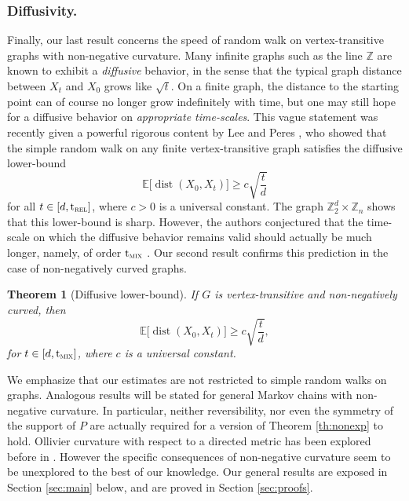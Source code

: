 \documentclass[JEP,XML,SOM,Unicode,NoEqCountersInSection,published]{cedram}
\newtheorem{theorem}{Theorem}
\theoremstyle{definition}
\newcommand{\dZ}{\mathbb {Z}}
\newcommand{\EE}{{\mathbb{E}}}
\newcommand{\trel}{\mathrm{t}_{\textup{\textsc{rel}}}}
\newcommand{\tmix}{\mathrm{t}_{\textup{\textsc{mix}}}}
\DeclareMathOperator{\dist}{dist}
\begin{document}
\subsubsection*{Diffusivity.}Finally, our last result concerns the speed of random walk on vertex-transitive graphs with non-negative curvature. Many infinite graphs such as the line $\dZ$ are known to exhibit a \emph{diffusive} behavior, in the sense that the typical graph distance between $X_t$ and $X_0$ grows like $\sqrt{t}$. On a finite graph, the distance to the starting point can of course no longer grow indefinitely with time, but one may still hope for a diffusive behavior on \emph{appropriate time-scales}. This vague statement was recently given a powerful rigorous content by Lee and Peres \cite{MR3127886}, who showed that the simple random walk on any finite vertex-transitive graph satisfies the diffusive lower-bound
\begin{equation*}
\EE \bigl[\dist(X_0,X_t) \bigr] \ge c\sqrt{\frac{t}{d}}
\end{equation*} for all $t\in[d,\trel]$, where $c>0$ is a universal constant. The graph $\dZ_2^{d}\times \dZ_n$ shows that this lower-bound is sharp. However, the authors conjectured that the time-scale on which the diffusive behavior remains valid should actually be much longer, namely, of order $\tmix$ \cite[Conj.\,2.5]{MR3127886}.
Our second result confirms this prediction in the case of non-negatively curved graphs.
\begin{theorem}[Diffusive lower-bound]\label{th:speed}If $G$ is vertex-transitive and non-negatively curved, then
\begin{equation*}
\EE \bigl[\dist(X_0,X_t) \bigr] \ge c\sqrt{\frac{t}{d}},
\end{equation*}
for $t\in[d,\tmix]$, where $c$ is a universal constant.
\end{theorem}

We emphasize that our estimates are not restricted to simple random walks on graphs. Analogous results will be stated for general Markov chains with non-negative curvature. In particular, neither reversibility, nor even the symmetry of the support of $P$ are actually required for a version of Theorem \ref{th:nonexp} to hold.
Ollivier curvature with respect to a directed metric has been explored before in \cite{yamada2016ricci,ozawa2020geometric,ozawa2022heat,
eidi2020ollivierJournal}. However the specific consequences of non-negative curvature seem to be unexplored
to the best of our knowledge. Our general results are exposed in Section \ref{sec:main} below, and are proved in Section \ref{sec:proofs}.
\end{document}
